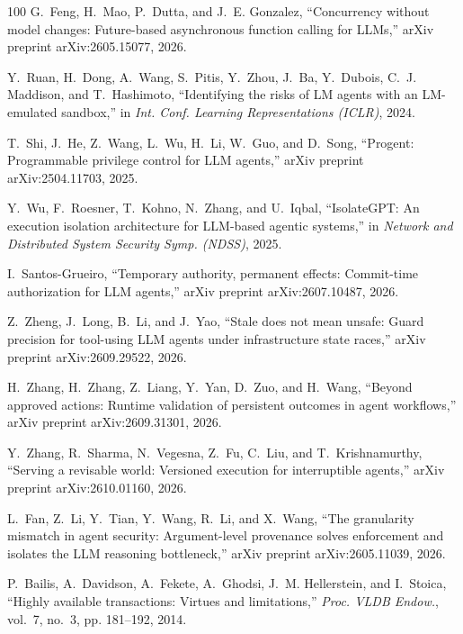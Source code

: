 \begin{thebibliography}{100}
G.~Feng, H.~Mao, P.~Dutta, and J.~E. Gonzalez, ``Concurrency without model changes: Future-based asynchronous function calling for {LLMs},'' arXiv preprint arXiv:2605.15077, 2026.

Y.~Ruan, H.~Dong, A.~Wang, S.~Pitis, Y.~Zhou, J.~Ba, Y.~Dubois, C.~J. Maddison, and T.~Hashimoto, ``Identifying the risks of {LM} agents with an {LM}-emulated sandbox,'' in \emph{Int. Conf. Learning Representations (ICLR)}, 2024.

T.~Shi, J.~He, Z.~Wang, L.~Wu, H.~Li, W.~Guo, and D.~Song, ``{Progent}: Programmable privilege control for {LLM} agents,'' arXiv preprint arXiv:2504.11703, 2025.

Y.~Wu, F.~Roesner, T.~Kohno, N.~Zhang, and U.~Iqbal, ``{IsolateGPT}: An execution isolation architecture for {LLM}-based agentic systems,'' in \emph{Network and Distributed System Security Symp. (NDSS)}, 2025.


I.~Santos-Grueiro, ``Temporary authority, permanent effects: Commit-time authorization for {LLM} agents,'' arXiv preprint arXiv:2607.10487, 2026.

Z.~Zheng, J.~Long, B.~Li, and J.~Yao, ``Stale does not mean unsafe: Guard precision for tool-using {LLM} agents under infrastructure state races,'' arXiv preprint arXiv:2609.29522, 2026.

H.~Zhang, H.~Zhang, Z.~Liang, Y.~Yan, D.~Zuo, and H.~Wang, ``Beyond approved actions: Runtime validation of persistent outcomes in agent workflows,'' arXiv preprint arXiv:2609.31301, 2026.

Y.~Zhang, R.~Sharma, N.~Vegesna, Z.~Fu, C.~Liu, and T.~Krishnamurthy, ``Serving a revisable world: Versioned execution for interruptible agents,'' arXiv preprint arXiv:2610.01160, 2026.

L.~Fan, Z.~Li, Y.~Tian, Y.~Wang, R.~Li, and X.~Wang, ``The granularity mismatch in agent security: Argument-level provenance solves enforcement and isolates the {LLM} reasoning bottleneck,'' arXiv preprint arXiv:2605.11039, 2026.


P.~Bailis, A.~Davidson, A.~Fekete, A.~Ghodsi, J.~M. Hellerstein, and I.~Stoica, ``Highly available transactions: Virtues and limitations,'' \emph{Proc. VLDB Endow.}, vol.~7, no.~3, pp. 181--192, 2014.


\end{thebibliography}
